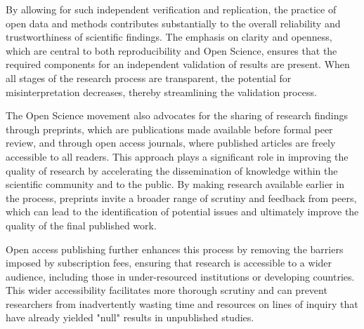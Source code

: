 \documentclass{article}
\begin{document}
By allowing for such independent verification and replication, the practice of open data and methods contributes substantially to the overall reliability and trustworthiness of scientific findings. The emphasis on clarity and openness, which are central to both reproducibility and Open Science, ensures that the required components for an independent validation of results are present. When all stages of the research process are transparent, the potential for misinterpretation decreases, thereby streamlining the validation process.

The Open Science movement also advocates for the sharing of research findings through preprints, which are publications made available before formal peer review, and through open access journals, where published articles are freely accessible to all readers. This approach plays a significant role in improving the quality of research by accelerating the dissemination of knowledge within the scientific community and to the public. By making research available earlier in the process, preprints invite a broader range of scrutiny and feedback from peers, which can lead to the identification of potential issues and ultimately improve the quality of the final published work.

Open access publishing further enhances this process by removing the barriers imposed by subscription fees, ensuring that research is accessible to a wider audience, including those in under-resourced institutions or developing countries. This wider accessibility facilitates more thorough scrutiny and can prevent researchers from inadvertently wasting time and resources on lines of inquiry that have already yielded "null" results in unpublished studies.
\end{document}
